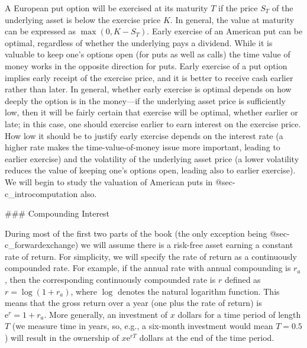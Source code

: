 A European put option will be exercised at its maturity $T$ if the price $S_T$ of the underlying asset is below the exercise price $K$.  In general, the value at maturity can be expressed as $\max(0,K-S_T)$.  Early exercise of an American put can be optimal, regardless of whether the underlying pays a dividend.  While it is valuable to keep one's options open (for puts as well as calls) the time value of money works in the opposite direction for puts.  Early exercise of a put option implies early receipt of the exercise price, and it is better to receive cash earlier rather than later. In general, whether early exercise is optimal depends on how deeply the option is in the money---if the underlying asset price is sufficiently low, then it will be fairly certain that exercise will be optimal, whether earlier or late; in this case, one should exercise earlier to earn interest on the exercise price.  How low it should be to justify early exercise depends on the interest rate (a higher rate makes the time-value-of-money issue more important, leading to earlier exercise) and the volatility of the underlying asset price (a lower volatility reduces the value of keeping one's options open, leading also to earlier exercise).  We will begin to study the valuation of American puts in @sec-c_introcomputation also.

### Compounding Interest

During most of the first two parts of the book (the only exception being @sec-c_forwardexchange) we will assume there is a risk-free asset earning a constant rate of return.   For simplicity, we will specify the rate of return as a continuously compounded rate.   For example, if the annual rate with annual compounding is $r_a$, then the corresponding continuously compounded rate is $r$ defined as $r = \log (1+r_a)$, where $\log$ denotes the natural logarithm function.  This means that the gross return over a year (one plus the rate of return) is $\mathrm{e}^r = 1+r_a$.  More generally, an investment of $x$ dollars for a time period of length $T$ (we measure time in years, so, e.g., a six-month investment would mean $T=0.5$) will result in the ownership of $x\mathrm{e}^{rT}$ dollars at the end of the time period.  

